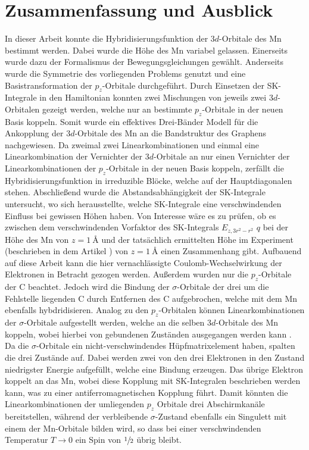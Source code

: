 \chapter{Zusammenfassung und Ausblick}
\label{chap:Zusammenfassung_und_Ausblick}
In dieser Arbeit konnte die Hybridisierungsfunktion der $3d$-Orbitale des Mn bestimmt werden.
Dabei wurde die Höhe des Mn variabel gelassen.
Einerseits wurde dazu der Formalismus der Bewegungsgleichungen gewählt.
Anderseits wurde die Symmetrie des vorliegenden Problems genutzt und eine Basistransformation der $p_z$-Orbitale durchgeführt. 
Durch Einsetzen der SK-Integrale in den Hamiltonian konnten zwei Mischungen von jeweils zwei $3d$-Orbitalen gezeigt werden, welche nur 
an bestimmte $p_z$-Orbitale in der neuen Basis koppeln.
Somit wurde ein effektives Drei-Bänder Modell für die Ankopplung der $3d$-Orbitale des Mn an die Bandstruktur des Graphens nachgewiesen.
Da zweimal zwei Linearkombinationen und einmal eine Linearkombination der Vernichter der $3d$-Orbitale an nur einen Vernichter der Linearkombinationen
der $p_z$-Orbitale in der neuen Basis koppeln, zerfällt die Hybridisierungsfunktion in irreduzible Blöcke, welche auf der Hauptdiagonalen stehen. 
Abschließend wurde die Abstandsabhängigkeit der SK-Integrale untersucht, wo sich herausstellte, welche SK-Integrale 
eine verschwindenden Einfluss bei gewissen Höhen haben.
Von Interesse wäre es zu prüfen, ob es zwischen dem verschwindenden Vorfaktor des SK-Integrals $E_{z,3r^2-r^2}$ $q$ bei der Höhe 
des Mn von $z=\qty{1}{\angstrom}$ und der tatsächlich ermittelten Höhe im Experiment (beschrieben in dem 
Artikel \cite{doi:10.1021/acsnano.1c00139}) von $z=\qty{1}{\angstrom}$ einen Zusammenhang gibt.
Aufbauend auf diese Arbeit kann die hier vernachlässigte Coulomb-Wechselwirkung der Elektronen in Betracht gezogen werden.
Außerdem wurden nur die $p_z$-Orbitale der C beachtet.
Jedoch wird die Bindung der $\sigma$-Orbitale der drei um die Fehlstelle liegenden C durch Entfernen des C
aufgebrochen, welche mit dem Mn ebenfalls hybdridisieren.
Analog zu den $p_z$-Orbitalen können Linearkombinationen der $\sigma$-Orbitale aufgestellt werden, welche an die selben 
$3d$-Orbitale des Mn koppeln, wobei hierbei von gebundenen Zuständen ausgegangen werden kann \cite{PhysRevB.97.155419}.
Da die $\sigma$-Orbitale ein nicht-verschwindendes Hüpfmatrixelement haben, spalten die drei Zustände auf.
Dabei werden zwei von den drei Elektronen in den Zustand niedrigster Energie aufgefüllt, welche eine Bindung erzeugen. 
Das übrige Elektron koppelt an das Mn, wobei diese Kopplung mit SK-Integralen beschrieben werden kann, was 
zu einer antiferromagnetischen Kopplung führt.
Damit könnten die Linearkombinationen der umliegenden $p_z$ Orbitale drei Abschirmkanäle bereitstellen, während der verbleibende $\sigma$-Zustand
ebenfalls ein Singulett mit einem der Mn-Orbitale bilden wird, so dass bei einer verschwindenden Temperatur $T \to 0$ ein Spin von 
$\sfrac{1}{2}$ übrig bleibt.